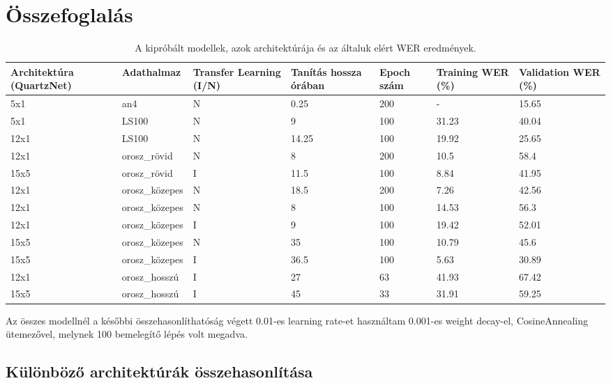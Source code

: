 \chapter{Összefoglalás}

\begin{table}[ht]
	\footnotesize
	\centering
	\begin{tabular}{ p{2.5cm} p{2.5cm} p{1.5cm} p{1.5cm} p{1cm} p{1.5cm} p{1.5cm} }
		\toprule
		\textbf{Architektúra (QuartzNet)} & \textbf{Adathalmaz} & \textbf {Transfer Learning (I/N)} & \textbf{Tanítás hossza órában} & \textbf{Epoch szám} & \textbf{Training WER (\%)} & \textbf{Validation WER (\%)} \\
		\midrule
		5x1 & an4 & N & 0.25 & 200 & - & 15.65 \\
		\hline
		5x1 & LS100 & N & 9 & 100 & 31.23 & 40.04 \\
		\hline
		12x1 & LS100 & N & 14.25 & 100 & 19.92 & 25.65 \\
		\hline
		12x1 & orosz\_rövid & N & 8 & 200 & 10.5 & 58.4 \\
		\hline
		15x5 & orosz\_rövid & I & 11.5 & 100 & 8.84 & 41.95 \\
		\hline
		12x1 & orosz\_közepes & N & 18.5 & 200 & 7.26 & 42.56 \\
		\hline
		12x1 & orosz\_közepes & N & 8 & 100 & 14.53 & 56.3 \\
		\hline
		12x1 & orosz\_közepes & I & 9 & 100 & 19.42 & 52.01 \\
		\hline
		15x5 & orosz\_közepes & N & 35 & 100 & 10.79 & 45.6 \\
		\hline
		15x5 & orosz\_közepes & I & 36.5 & 100 & 5.63 & 30.89 \\
		\hline
		12x1 & orosz\_hosszú & I & 27 & 63 & 41.93 & 67.42 \\
		\hline
		15x5 & orosz\_hosszú & I & 45 & 33 & 31.91 & 59.25 \\
		\bottomrule
	\end{tabular}
	\caption{A kipróbált modellek, azok architektúrája és az általuk elért WER eredmények.}
\end{table}

Az összes modellnél a későbbi összehasonlíthatóság végett 0.01-es learning rate-et használtam 0.001-es weight decay-el, CosineAnnealing ütemezővel, melynek 100 bemelegítő lépés volt megadva.

\section{Különböző architektúrák összehasonlítása}

